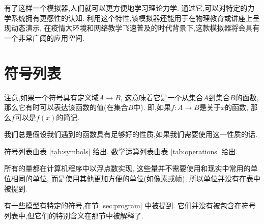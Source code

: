 \documentclass[12pt]{article}
\begin{document}
有了这样一个模拟器,人们就可以更方便地学习理论力学.
通过它,可以对特定的力学系统拥有更感性的认知.
利用这个特性,该模拟器还能用于在物理教育或讲座上呈现动态演示,
在疫情大环境和网络教学飞速普及的时代背景下,这款模拟器将会具有一个非常广阔的应用空间.

\section{符号列表}

注意,如果一个符号具有定义域$A\rightarrow B$,
这意味着它是一个从集合$A$到集合$B$的函数,
那么它有时可以表达该函数的值(在集合$B$中).
即,如果$f:A\rightarrow B$是关于$x$的函数,
那么$f$可以是$f\left(x\right)$的简记.

我们总是假设我们遇到的函数具有足够好的性质,如果我们需要使用这一性质的话.

符号列表由表 \ref{tab:symbols} 给出.
数学运算列表由表 \ref{tab:operations} 给出.

所有的量都在计算机程序中以浮点数实现,
这些量并不需要使用和现实中常用的单位相同的单位,
而是使用其他更加方便的单位(如像素或帧),
所以单位并没有在表中被提到.

有一些模型有特定的符号,在节 \ref{sec:program} 中被提到.
它们并没有被包含在符号列表中,但它们的特别含义在那节中被解释了.
\end{document}
